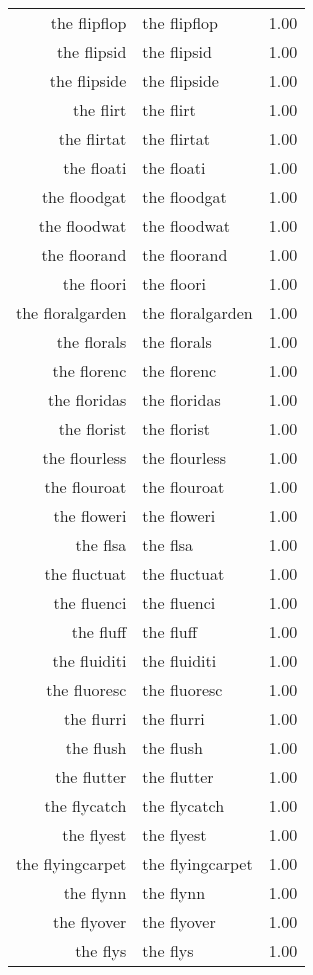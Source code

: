 \begin{table}[ht]
\begin{tabular}{rlr}
  the flipflop & the flipflop & 1.00 \\ 
  the flipsid & the flipsid & 1.00 \\ 
  the flipside & the flipside & 1.00 \\ 
  the flirt & the flirt & 1.00 \\ 
  the flirtat & the flirtat & 1.00 \\ 
  the floati & the floati & 1.00 \\ 
  the floodgat & the floodgat & 1.00 \\ 
  the floodwat & the floodwat & 1.00 \\ 
  the floorand & the floorand & 1.00 \\ 
  the floori & the floori & 1.00 \\ 
  the floralgarden & the floralgarden & 1.00 \\ 
  the florals & the florals & 1.00 \\ 
  the florenc & the florenc & 1.00 \\ 
  the floridas & the floridas & 1.00 \\ 
  the florist & the florist & 1.00 \\ 
  the flourless & the flourless & 1.00 \\ 
  the flouroat & the flouroat & 1.00 \\ 
  the floweri & the floweri & 1.00 \\ 
  the flsa & the flsa & 1.00 \\ 
  the fluctuat & the fluctuat & 1.00 \\ 
  the fluenci & the fluenci & 1.00 \\ 
  the fluff & the fluff & 1.00 \\ 
  the fluiditi & the fluiditi & 1.00 \\ 
  the fluoresc & the fluoresc & 1.00 \\ 
  the flurri & the flurri & 1.00 \\ 
  the flush & the flush & 1.00 \\ 
  the flutter & the flutter & 1.00 \\ 
  the flycatch & the flycatch & 1.00 \\ 
  the flyest & the flyest & 1.00 \\ 
  the flyingcarpet & the flyingcarpet & 1.00 \\ 
  the flynn & the flynn & 1.00 \\ 
  the flyover & the flyover & 1.00 \\ 
  the flys & the flys & 1.00 \\ 

\end{tabular}
\end{table}
